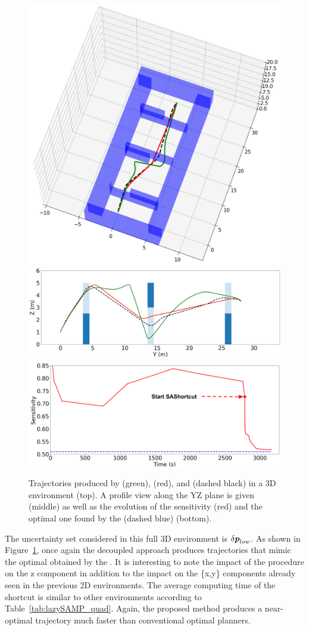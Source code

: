 \begin{figure}[h]
\centering
    \includegraphics[width=0.7\linewidth]{figures/samp/3D_full_view.png}
    \includegraphics[width=0.7\linewidth]{figures/samp/3D_ZYprofile.png}
    \includegraphics[width=0.7\linewidth]{figures/samp/3D_sensi.png}
    \caption{Trajectories produced by  (green),  (red), and  (dashed black) in a 3D environment (top). 
    A profile view along the YZ plane is given (middle) as well as the evolution of the sensitivity (red) and the optimal one found by the  (dashed blue) (bottom).}
    \label{fig:3D}
\end{figure}

The uncertainty set considered in this full 3D environment is $\delta\boldsymbol{p}_{low}$.
As shown in Figure~\ref{fig:3D}, once again the decoupled approach produces trajectories that mimic the optimal obtained by the .
It is interesting to note the impact of the  procedure on the z component in addition to the impact on the \{x,y\} components already seen in the previous 2D environments.
The average computing time of the shortcut is similar to other environments according to Table~\ref{tab:lazySAMP_quad}.
Again, the proposed method produces a near-optimal trajectory much faster than conventional optimal planners.

